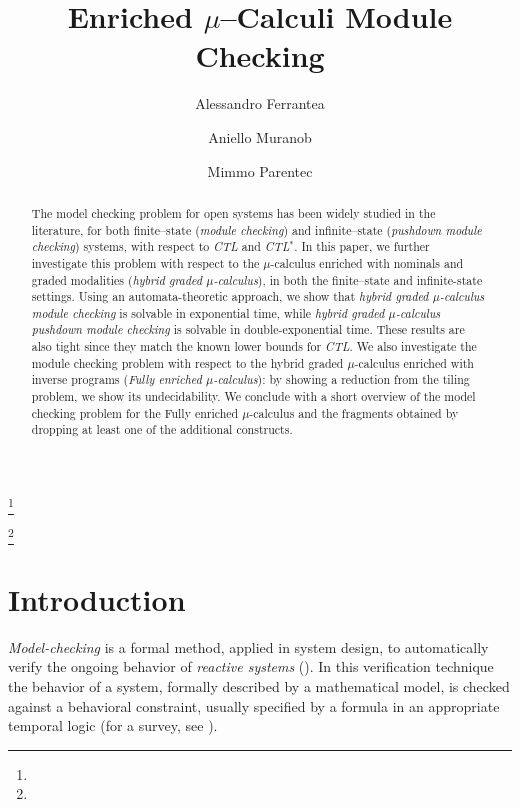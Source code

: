 \documentclass{LMCS}
\theoremstyle{plain}
\def \CTL           {\emph{CTL}\xspace}
\def \CTLSTAR       {\emph{CTL$^*$}\xspace}
\begin{document}
\title{Enriched $\mu$--Calculi Module Checking\rsuper *}

\author[A.~Ferrante] {Alessandro Ferrante\rsuper a}
\address{{}Universit\`a di Salerno, Via Ponte don Melillo, 84084 -
Fisciano (SA), Italy} 
\thanks{}


\author[A.~Murano]{Aniello Murano\rsuper b}
\address{{\lsuper b}Universit\`{a} di Napoli ``Federico II'', Dipartimento di
Scienze Fisiche, 80126 Napoli, Italy} 
\thanks{}

\author[M.~Parente]{Mimmo Parente\rsuper c}



\begin{abstract}
The model checking problem for open systems has been widely studied in the
literature, for both finite--state (\emph{module checking}) and infinite--state
(\emph{pushdown module checking}) systems, with respect to \CTL and \CTLSTAR.
In this paper, we further investigate this problem with respect to the
$\mu$-calculus enriched with nominals and graded modalities (\emph{hybrid
graded $\mu$-calculus}), in both the finite--state and infinite-state settings.
Using an automata-theoretic approach, we show that \emph{hybrid graded
$\mu$-calculus module checking} is solvable in exponential time, while
\emph{hybrid graded $\mu$-calculus pushdown module checking} is solvable in
double-exponential time. These results are also tight since they match the
known lower bounds for \CTL. We also investigate the module checking problem
with respect to the hybrid graded $\mu$-calculus enriched with inverse programs
(\emph{Fully enriched $\mu$-calculus}): by showing a reduction from the tiling
problem, we show its undecidability. We conclude with a short overview of the
model checking problem for the Fully enriched $\mu$-calculus and the fragments
obtained by dropping at least one of the additional constructs.
\end{abstract}

\maketitle

\section{Introduction}\label{sec:Introduction}
\emph{Model-checking} is a formal method, applied in system design, to
automatically verify the ongoing behavior of \emph{reactive systems}
(\cite{CE81,QS81}). In this verification technique the behavior of a system,
formally described by a mathematical model, is checked against a behavioral
constraint, usually specified by a formula in an appropriate temporal logic
(for a survey, see \cite{CGP99}).
\end{document}
